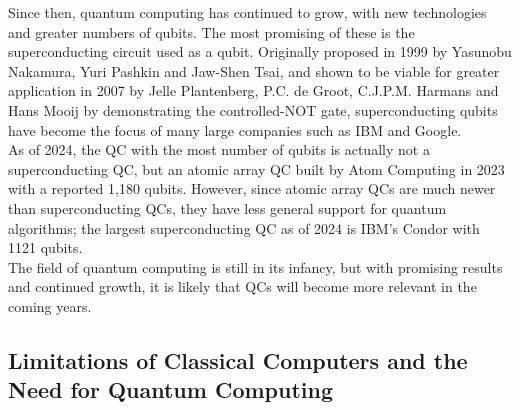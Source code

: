 \documentclass[reqno]{amsart}
\numberwithin{equation}{section}
\numberwithin{figure}{section}
\begin{document}
\begin{justify}
Since then, quantum computing has continued to grow, with new technologies and greater numbers of qubits. The most promising of these is the superconducting circuit used as a qubit. Originally proposed in 1999 by Yasunobu Nakamura, Yuri Pashkin and Jaw-Shen Tsai, \cite{NakamuraPashkinTsai1999} and shown to be viable for greater application in 2007 by Jelle Plantenberg, P.C. de Groot, C.J.P.M. Harmans and Hans Mooij by demonstrating the controlled-NOT gate, \cite{PlantenbergGrootHarmansMooij2007} superconducting qubits have become the focus of many large companies such as IBM and Google. \\

As of 2024, the QC with the most number of qubits is actually not a superconducting QC, but an atomic array QC built by Atom Computing in 2023 \cite{Atom2023, Atom2024} with a reported 1,180 qubits. However, since atomic array QCs are much newer than superconducting QCs, they have less general support for quantum algorithms; the largest superconducting QC as of 2024 is IBM's Condor with 1121 qubits. \cite{IBM2023, AbuGhanem2024} \\

The field of quantum computing is still in its infancy, but with promising results and continued growth, it is likely that QCs will become more relevant in the coming years.
\end{justify}

\subsection{Limitations of Classical Computers and the Need for Quantum Computing}
\end{document}
